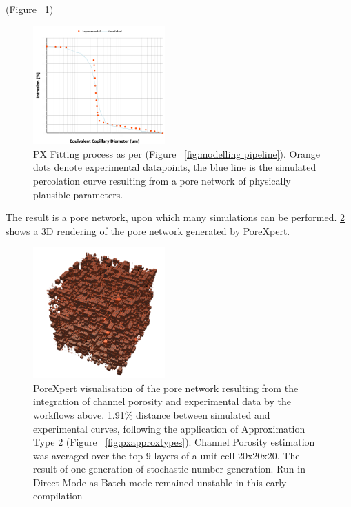 \documentclass[3p,twocolumn]{elsarticle}
\begin{document}
  (Figure ~\ref{fig:PXfittinggraph})
    \begin{figure}
        \centering
        \includegraphics[width=0.45\textwidth]{./Media/Fit to percolation curve.png}
        \caption{PX Fitting process as per (Figure ~\ref{fig:modelling pipeline}). Orange dots denote experimental datapoints, the blue line is the simulated percolation curve resulting from a pore network of physically plausible parameters.}
        \label{fig:PXfittinggraph}
    \end{figure}

  The result is a pore network, upon which many simulations can be performed.
  \ref{fig:PX3dnetwork} shows a 3D rendering of the pore network generated by
  PoreXpert.

      \begin{figure}
        \centering
        \includegraphics[width=0.45\textwidth]{./Media/unit cell no bg.png}
        \caption{PoreXpert visualisation of the pore network resulting from the
        integration of channel porosity and experimental data by the workflows
        above. 1.91\% distance between simulated and experimental curves,
        following the application of Approximation Type 2 (Figure
        ~\ref{fig:pxapproxtypes}). Channel Porosity estimation was averaged over
        the top 9 layers of a unit cell 20x20x20. The result of one generation
        of stochastic number generation. Run in Direct Mode as Batch mode
        remained unstable in this early compilation}
        \label{fig:PX3dnetwork}
    \end{figure}
\end{document}

